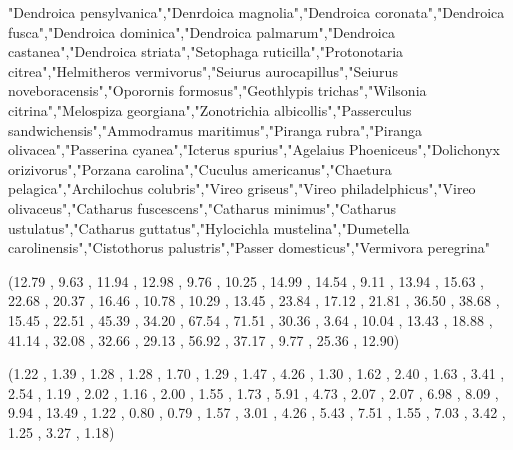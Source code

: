 "Dendroica pensylvanica","Denrdoica magnolia","Dendroica coronata","Dendroica fusca","Dendroica dominica","Dendroica palmarum","Dendroica castanea","Dendroica striata","Setophaga ruticilla","Protonotaria citrea","Helmitheros vermivorus","Seiurus aurocapillus","Seiurus noveboracensis","Oporornis formosus","Geothlypis trichas","Wilsonia citrina","Melospiza georgiana","Zonotrichia albicollis","Passerculus sandwichensis","Ammodramus maritimus","Piranga rubra","Piranga olivacea","Passerina cyanea","Icterus spurius","Agelaius Phoeniceus","Dolichonyx orizivorus","Porzana carolina","Cuculus americanus","Chaetura pelagica","Archilochus colubris","Vireo griseus","Vireo philadelphicus","Vireo olivaceus","Catharus fuscescens","Catharus minimus","Catharus ustulatus","Catharus guttatus","Hylocichla mustelina","Dumetella carolinensis","Cistothorus palustris","Passer domesticus","Vermivora peregrina" 

(12.79 , 9.63 , 11.94 , 12.98 , 9.76 , 10.25 , 14.99 , 14.54 , 9.11 , 13.94 , 15.63 , 22.68 , 20.37 , 16.46 , 10.78 , 10.29 , 13.45 , 23.84 , 17.12 , 21.81 , 36.50 , 38.68 , 15.45 , 22.51 , 45.39 , 34.20 , 67.54 , 71.51 , 30.36 , 3.64 , 10.04 , 13.43 , 18.88 , 41.14 , 32.08 , 32.66 , 29.13 , 56.92 , 37.17 , 9.77 , 25.36 , 12.90) 

(1.22 , 1.39 , 1.28 , 1.28 , 1.70 , 1.29 , 1.47 , 4.26 , 1.30 , 1.62 , 2.40 , 1.63 , 3.41 , 2.54 , 1.19 , 2.02 , 1.16 , 2.00 , 1.55 , 1.73 , 5.91 , 4.73 , 2.07 , 2.07 , 6.98 , 8.09 , 9.94 , 13.49 , 1.22 , 0.80 , 0.79 , 1.57 , 3.01 , 4.26 , 5.43 , 7.51 , 1.55 , 7.03 , 3.42 , 1.25 , 3.27 , 1.18)
